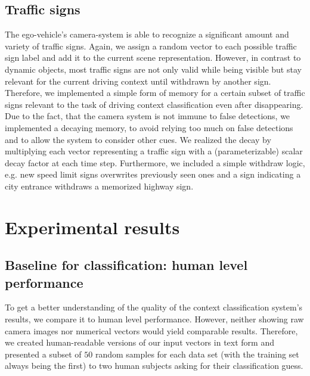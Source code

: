 \subsection{Traffic signs}
The ego-vehicle's camera-system \cite{Aeberhard2015} is able to recognize a significant amount and variety of traffic signs.
Again, we assign a random vector to each possible traffic sign label and add it to the current scene representation.
However, in contrast to dynamic objects, most traffic signs are not only valid while being visible but stay relevant for the current driving context until withdrawn by another sign.
Therefore, we implemented a simple form of memory for a certain subset of traffic signs relevant to the task of driving context classification even after disappearing. %
Due to the fact, that the camera system is not immune to false detections, we implemented a decaying memory, to avoid relying too much on false detections and to allow the system to consider other cues.
We realized the decay by multiplying each vector representing a traffic sign with a (parameterizable) scalar decay factor  at each time step.
Furthermore, we included a simple withdraw logic, e.g. new speed limit signs overwrites previously seen ones and a sign indicating a city entrance withdraws a memorized highway sign.\\
\section{Experimental results}

\subsection{Baseline for classification: human level performance}
To get a better understanding of the quality of the context classification system's results, we compare it to human level performance.
However, neither showing raw camera images nor numerical vectors would yield comparable results.
Therefore, we created human-readable versions of our input vectors in text form and presented a subset of $50$ random samples for each data set (with the training set always being the first) to two human subjects asking for their classification guess.
